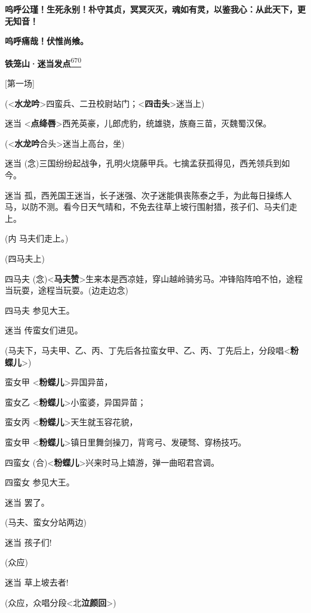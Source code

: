\textbf{呜呼公瑾！生死永别！朴守其贞，冥冥灭灭，魂如有灵，以鉴我心：从此天下，更无知音！}

\textbf{呜呼痛哉！伏惟尚飨。}

\textbf{铁笼山·迷当发点}\protect\hyperlink{fn670}{\textsuperscript{670}}

{[}第一场{]}

(\textless{}\textbf{水龙吟}\textgreater{}四蛮兵、二丑校尉站门；\textless{}\textbf{四击头}\textgreater{}迷当上)

迷当
\textless{}\textbf{点绛唇}\textgreater{}西羌英豪，儿郎虎豹，统雄骁，族裔三苗，灭魏蜀汉保。

(\textless{}\textbf{水龙吟}合头\textgreater{}迷当上高台，坐)

迷当
(念)三国纷纷起战争，孔明火烧藤甲兵。七擒孟获孤得见，西羌领兵到如今。

迷当
孤，西羌国王迷当，长子迷强、次子迷能俱丧陈泰之手，为此每日操练人马，以防不测。看今日天气晴和，不免去往草上坡行围射猎，孩子们、马夫们走上。

(内 马夫们走上。)

(四马夫上)

四马夫
(念)\textless{}\textbf{马夫赞}\textgreater{}生来本是西凉娃，穿山越岭骑劣马。冲锋陷阵咱不怕，途程当玩耍，途程当玩耍。(边走边念)

四马夫 参见大王。

迷当 传蛮女们进见。

(马夫下，马夫甲、乙、丙、丁先后各拉蛮女甲、乙、丙、丁先后上，分段唱\textless{}\textbf{粉蝶儿}\textgreater{})

蛮女甲 \textless{}\textbf{粉蝶儿}\textgreater{}异国异苗，

蛮女乙 \textless{}\textbf{粉蝶儿}\textgreater{}小蛮婆，异国异苗；

蛮女丙 \textless{}\textbf{粉蝶儿}\textgreater{}天生就玉容花貌，

蛮女甲
\textless{}\textbf{粉蝶儿}\textgreater{}镇日里舞剑操刀，背弯弓、发硬驽、穿杨技巧。

四蛮女
(合)\textless{}\textbf{粉蝶儿}\textgreater{}兴来时马上嬉游，弹一曲昭君宫调。

四蛮女 参见大王。

迷当 罢了。

(马夫、蛮女分站两边)

迷当 孩子们!

(众应)

迷当 草上坡去者!

(众应，众唱分段\textless{}北\textbf{泣颜回}\textgreater{})

